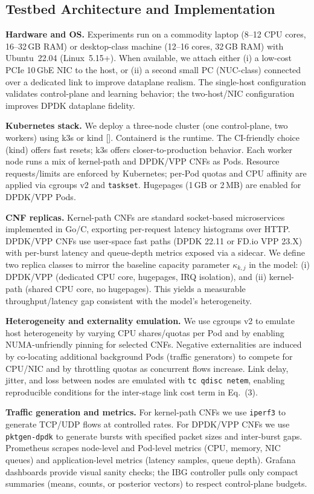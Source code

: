\documentclass[journal]{IEEEtran}
\theoremstyle{plain}
\theoremstyle{definition}
\theoremstyle{remark}
\begin{document}
\subsection{Testbed Architecture and Implementation}
\label{sec:exp_arch_impl}

\textbf{Hardware and OS.} Experiments run on a commodity laptop (8–12 CPU cores, 16–32\,GB RAM) or desktop-class machine (12–16 cores, 32\,GB RAM) with Ubuntu~22.04 (Linux~5.15+). When available, we attach either (i) a low-cost PCIe 10\,GbE NIC to the host, or (ii) a second small PC (NUC-class) connected over a dedicated link to improve dataplane realism. The single-host configuration validates control-plane and learning behavior; the two-host/NIC configuration improves DPDK dataplane fidelity.

\textbf{Kubernetes stack.} We deploy a three-node cluster (one control-plane, two workers) using k3s or kind []. Containerd is the runtime. The CI-friendly choice (kind) offers fast resets; k3s offers closer-to-production behavior. Each worker node runs a mix of kernel-path and DPDK/VPP CNFs as Pods. Resource requests/limits are enforced by Kubernetes; per-Pod quotas and CPU affinity are applied via cgroups v2 and \texttt{taskset}. Hugepages (1\,GB or 2\,MB) are enabled for DPDK/VPP Pods.

\textbf{CNF replicas.} Kernel-path CNFs are standard socket-based microservices implemented in Go/C, exporting per-request latency histograms over HTTP. DPDK/VPP CNFs use user-space fast paths (DPDK 22.11 or FD.io VPP 23.X) with per-burst latency and queue-depth metrics exposed via a sidecar. We define two replica classes to mirror the baseline capacity parameter $\kappa_{k,j}$ in the model: (i) DPDK/VPP (dedicated CPU core, hugepages, IRQ isolation), and (ii) kernel-path (shared CPU core, no hugepages). This yields a measurable throughput/latency gap consistent with the model’s heterogeneity.

\textbf{Heterogeneity and externality emulation.} We use cgroups v2 to emulate host heterogeneity by varying CPU shares/quotas per Pod and by enabling NUMA-unfriendly pinning for selected CNFs. Negative externalities are induced by co-locating additional background Pods (traffic generators) to compete for CPU/NIC and by throttling quotas as concurrent flows increase. Link delay, jitter, and loss between nodes are emulated with \texttt{tc qdisc netem}, enabling reproducible conditions for the inter-stage link cost term in Eq.~(3).

\textbf{Traffic generation and metrics.} For kernel-path CNFs we use \texttt{iperf3} to generate TCP/UDP flows at controlled rates. For DPDK/VPP CNFs we use \texttt{pktgen-dpdk} to generate bursts with specified packet sizes and inter-burst gaps. Prometheus scrapes node-level and Pod-level metrics (CPU, memory, NIC queues) and application-level metrics (latency samples, queue depth). Grafana dashboards provide visual sanity checks; the IBG controller pulls only compact summaries (means, counts, or posterior vectors) to respect control-plane budgets.
\end{document}

